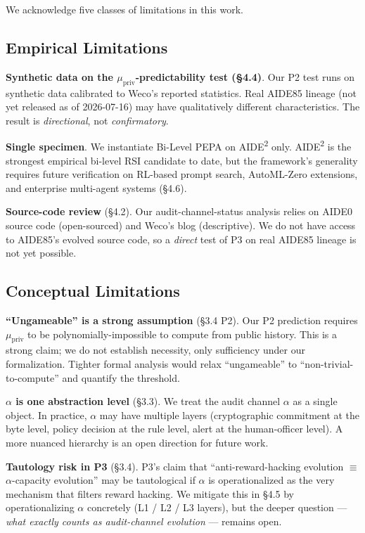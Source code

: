 
We acknowledge five classes of limitations in this work.

\subsection{Empirical Limitations}

\textbf{Synthetic data on the $\mu_{\text{priv}}$-predictability test (\S4.4)}. Our P2 test runs on synthetic data calibrated to Weco's reported statistics. Real AIDE85 lineage (not yet released as of 2026-07-16) may have qualitatively different characteristics. The result is \emph{directional}, not \emph{confirmatory}.

\textbf{Single specimen}. We instantiate Bi-Level PEPA on AIDE\textsuperscript{2} only. AIDE\textsuperscript{2} is the strongest empirical bi-level RSI candidate to date, but the framework's generality requires future verification on RL-based prompt search, AutoML-Zero extensions, and enterprise multi-agent systems (\S4.6).

\textbf{Source-code review} (\S4.2). Our audit-channel-status analysis relies on AIDE0 source code (open-sourced) and Weco's blog (descriptive). We do not have access to AIDE85's evolved source code, so a \emph{direct} test of P3 on real AIDE85 lineage is not yet possible.

\subsection{Conceptual Limitations}

\textbf{``Ungameable'' is a strong assumption} (\S3.4 P2). Our P2 prediction requires $\mu_{\text{priv}}$ to be polynomially-impossible to compute from public history. This is a strong claim; we do not establish necessity, only sufficiency under our formalization. Tighter formal analysis would relax ``ungameable'' to ``non-trivial-to-compute'' and quantify the threshold.

\textbf{$\alpha$ is one abstraction level} (\S3.3). We treat the audit channel $\alpha$ as a single object. In practice, $\alpha$ may have multiple layers (cryptographic commitment at the byte level, policy decision at the rule level, alert at the human-officer level). A more nuanced hierarchy is an open direction for future work.

\textbf{Tautology risk in P3} (\S3.4). P3's claim that ``anti-reward-hacking evolution $\equiv$ $\alpha$-capacity evolution'' may be tautological if $\alpha$ is operationalized as the very mechanism that filters reward hacking. We mitigate this in \S4.5 by operationalizing $\alpha$ concretely (L1 / L2 / L3 layers), but the deeper question --- \emph{what exactly counts as audit-channel evolution} --- remains open.

